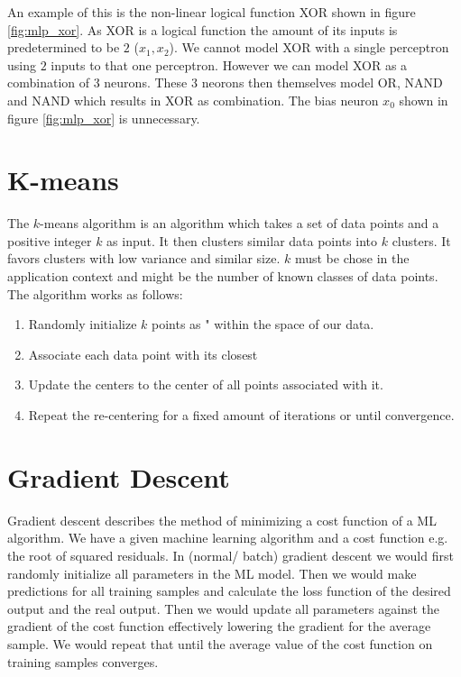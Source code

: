 An example of this is the non-linear logical function XOR shown in figure \ref{fig:mlp_xor}. As XOR is a logical function the amount of its inputs is predetermined to be $2$ ($x_{1}, x_{2}$). We cannot model XOR with a single perceptron using $2$ inputs to that one perceptron. However we can model XOR as a combination of 3 neurons. These 3 neorons then themselves model OR, NAND and NAND which results in XOR as combination. The bias neuron $x_{0}$ shown in figure \ref{fig:mlp_xor} is unnecessary.

\section{K-means}

The $k$-means algorithm is an algorithm which takes a set of data points and a positive integer $k$ as input. It then clusters similar data points into $k$ clusters. It favors clusters with low variance and similar size. $k$ must be chose in the application context and might be the number of known classes of data points.\\

The algorithm works as follows:
\begin{enumerate}
    \item Randomly initialize $k$ points as " within the space of our data.
    \item Associate each data point with its closest 
    \item Update the centers to the center of all points associated with it.
    \item Repeat the re-centering for a fixed amount of iterations or until convergence.
\end{enumerate}

\section{Gradient Descent}
\label{sec:gradient_descent}

Gradient descent describes the method of minimizing a cost function of a ML algorithm. We have a given machine learning algorithm and a cost function e.g. the root of squared residuals. In (normal/ batch) gradient descent we would first randomly initialize all parameters in the ML model. Then we would make predictions for all training samples and calculate the loss function of the desired output and the real output. Then we would update all parameters against the gradient of the cost function effectively lowering the gradient for the average sample. We would repeat that until the average value of the cost function on training samples converges.


